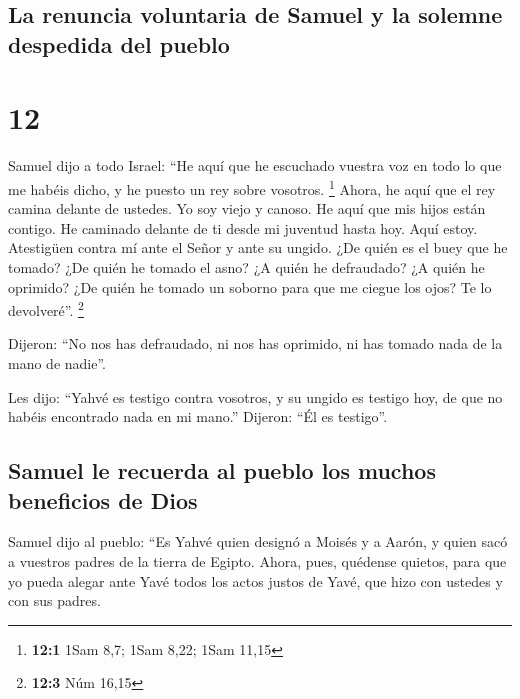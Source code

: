 \hypertarget{la-renuncia-voluntaria-de-samuel-y-la-solemne-despedida-del-pueblo}{%
\subsection{La renuncia voluntaria de Samuel y la solemne despedida del
pueblo}\label{la-renuncia-voluntaria-de-samuel-y-la-solemne-despedida-del-pueblo}}

\hypertarget{section-11}{%
\section{12}\label{section-11}}

 Samuel dijo a todo Israel: ``He aquí que he escuchado
vuestra voz en todo lo que me habéis dicho, y he puesto un rey sobre
vosotros. \footnote{\textbf{12:1} 1Sam 8,7; 1Sam 8,22; 1Sam 11,15}
 Ahora, he aquí que el rey camina delante de ustedes. Yo
soy viejo y canoso. He aquí que mis hijos están contigo. He caminado
delante de ti desde mi juventud hasta hoy.  Aquí estoy.
Atestigüen contra mí ante el Señor y ante su ungido. ¿De quién es el
buey que he tomado? ¿De quién he tomado el asno? ¿A quién he defraudado?
¿A quién he oprimido? ¿De quién he tomado un soborno para que me ciegue
los ojos? Te lo devolveré''. \footnote{\textbf{12:3} Núm 16,15}

 Dijeron: ``No nos has defraudado, ni nos has oprimido, ni
has tomado nada de la mano de nadie''.

 Les dijo: ``Yahvé es testigo contra vosotros, y su ungido
es testigo hoy, de que no habéis encontrado nada en mi mano.'' Dijeron:
``Él es testigo''.

\hypertarget{samuel-le-recuerda-al-pueblo-los-muchos-beneficios-de-dios}{%
\subsection{Samuel le recuerda al pueblo los muchos beneficios de
Dios}\label{samuel-le-recuerda-al-pueblo-los-muchos-beneficios-de-dios}}

 Samuel dijo al pueblo: ``Es Yahvé quien designó a Moisés
y a Aarón, y quien sacó a vuestros padres de la tierra de Egipto.
 Ahora, pues, quédense quietos, para que yo pueda alegar
ante Yavé todos los actos justos de Yavé, que hizo con ustedes y con sus
padres.

